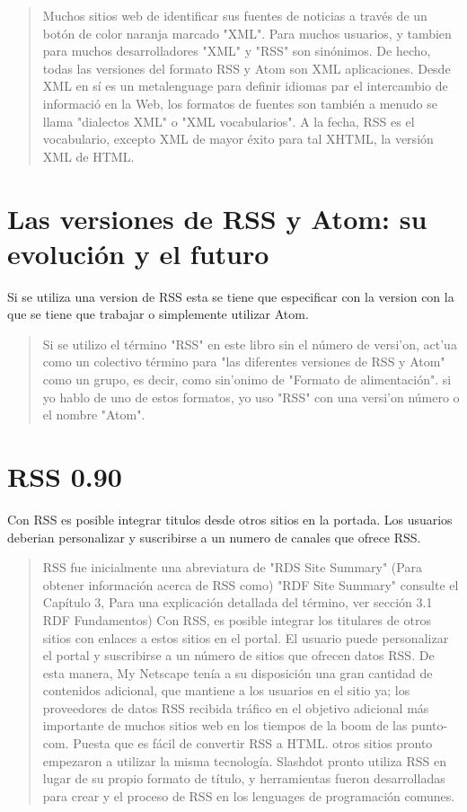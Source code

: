 \scriptsize

\blockquote{
Muchos sitios web de identificar sus fuentes de noticias a trav\'{e}s de un bot\'{o}n de color naranja marcado "XML". Para muchos
usuarios, y tambien para muchos desarrolladores "XML" y "RSS" son sin\'{o}nimos. De hecho, todas las versiones del formato RSS y
Atom son XML aplicaciones. Desde XML en s\'{i} es un metalenguage para definir idiomas par el intercambio de informaci\'{o} en la
Web, los formatos de fuentes son tambi\'{e}n a menudo se llama "dialectos XML" o "XML vocabularios". A la fecha, RSS es el vocabulario, 
excepto XML de mayor \'{e}xito para tal XHTML, la versi\'{o}n XML de HTML.\cite{wittenbrink2005rss}
}

\normalsize

\section{Las versiones de RSS y Atom: su evoluci\'{o}n y el futuro}
Si se utiliza una version de RSS esta se tiene que especificar con la version con la que se tiene
que trabajar o simplemente utilizar Atom.

\scriptsize

\blockquote{
Si se utilizo el t\'{e}rmino "RSS" en este libro sin el n\'{u}mero de versi'{o}n, act'{u}a como un colectivo
t\'{e}rmino para "las diferentes versiones de RSS y Atom" como un grupo, es decir, como sin'{o}nimo de "Formato
de alimentaci\'{o}n". si yo hablo de uno de estos formatos, yo uso "RSS" con una versi'{o}n n\'{u}mero o el nombre
"Atom".\cite{wittenbrink2005rss}
}

\normalsize 

\section{RSS 0.90}

Con RSS es posible integrar titulos desde otros sitios en la portada. Los usuarios deberian personalizar
y suscribirse a un numero de canales que ofrece RSS.

\scriptsize

\blockquote{
RSS fue inicialmente una abreviatura de "RDS Site Summary" (Para obtener informaci\'{o}n acerca de RSS como)
"RDF Site Summary" consulte el Cap\'{i}tulo 3, Para una explicaci\'{o}n detallada del t\'{e}rmino, ver secci\'{o}n
3.1 RDF Fundamentos) Con RSS, es posible integrar los titulares de otros sitios con enlaces a estos sitios en el 
portal. El usuario puede personalizar el portal y suscribirse a un n\'{u}mero de sitios que ofrecen datos RSS.
De esta manera, My Netscape ten\'{i}a a su disposici\'{o}n una gran cantidad de contenidos adicional, que mantiene
a los usuarios en el sitio ya; los proveedores de datos RSS recibida tr\'{a}fico en el objetivo adicional m\'{a}s
importante de muchos sitios web en los tiempos de la boom de las punto-com. Puesta que es f\'{a}cil de convertir 
RSS a HTML. otros sitios pronto empezaron a utilizar la misma tecnolog\'{i}a. Slashdot pronto utiliza RSS en lugar
de su propio formato de t\'{i}tulo, y herramientas fueron desarrolladas para crear y el proceso de RSS en los 
lenguages de programaci\'{o}n comunes.\cite{wittenbrink2005rss}
}

